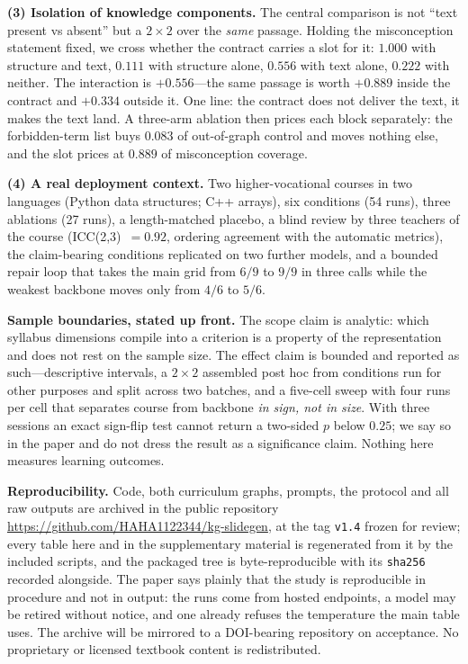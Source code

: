 \documentclass[10pt,a4paper]{article}
\begin{document}
\textbf{(3) Isolation of knowledge components.} The central comparison is not
``text present vs absent'' but a $2\times2$ over the \emph{same} passage.
Holding the misconception statement fixed, we cross whether the contract carries
a slot for it: $1.000$ with structure and text, $0.111$ with structure alone,
$0.556$ with text alone, $0.222$ with neither. The interaction is $+0.556$---the
same passage is worth $+0.889$ inside the contract and $+0.334$ outside it. One
line: the contract does not deliver the text, it makes the text land. A
three-arm ablation then prices each block separately: the forbidden-term list
buys $0.083$ of out-of-graph control and moves nothing else, and the slot prices
at $0.889$ of misconception coverage.

\textbf{(4) A real deployment context.} Two higher-vocational courses in two
languages (Python data structures; C++ arrays), six conditions (54 runs), three
ablations (27 runs), a length-matched placebo, a blind review by three teachers
of the course (ICC(2,3)~$=0.92$, ordering agreement with the automatic metrics),
the claim-bearing conditions replicated on two further models, and a bounded
repair loop that takes the main grid from $6/9$ to $9/9$ in three calls while the
weakest backbone moves only from $4/6$ to $5/6$.

\textbf{Sample boundaries, stated up front.} The scope claim is analytic: which
syllabus dimensions compile into a criterion is a property of the representation
and does not rest on the sample size. The effect claim is bounded and reported as
such---descriptive intervals, a $2\times2$ assembled post hoc from conditions run
for other purposes and split across two batches, and a five-cell sweep with four
runs per cell that separates course from backbone \emph{in sign, not in size}.
With three sessions an exact sign-flip test cannot return a two-sided $p$ below
$0.25$; we say so in the paper and do not dress the result as a significance
claim. Nothing here measures learning outcomes.

\textbf{Reproducibility.} Code, both curriculum graphs, prompts, the protocol and
all raw outputs are archived in the public repository
\url{https://github.com/HAHA1122344/kg-slidegen}, at the tag
\texttt{v1.4} frozen for review; every table here and in the supplementary
material is regenerated from it by the included scripts, and the packaged tree is
byte-reproducible with its \texttt{sha256} recorded alongside. The paper says plainly that the study is reproducible in procedure and not in
output: the runs come from hosted endpoints, a model may be retired without
notice, and one already refuses the temperature the main table uses. The archive
will be mirrored to a DOI-bearing repository on acceptance. No proprietary or
licensed textbook content is redistributed.
\end{document}
